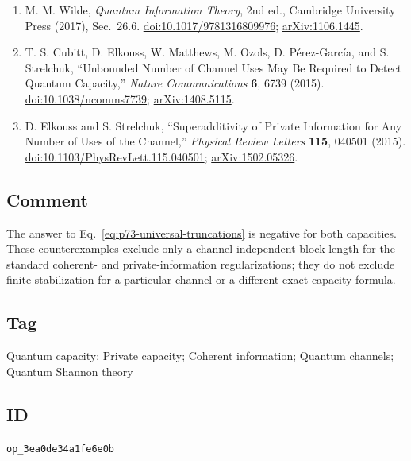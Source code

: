 \begin{enumerate}[label={},leftmargin=4.8em,labelsep=0.5em]
  \footnotesize
  \item[\textup{[Wil17]}]\label{ref:p73-wilde}
  M. M. Wilde, \emph{Quantum Information Theory}, 2nd ed., Cambridge
  University Press (2017), Sec.~26.6.
  \href{https://doi.org/10.1017/9781316809976}%
       {doi:10.1017/9781316809976};
  \href{https://arxiv.org/abs/1106.1445}{arXiv:1106.1445}.

  \item[\textup{[CEM+15]}]\label{ref:p73-cubitt-et-al}
  T. S. Cubitt, D. Elkouss, W. Matthews, M. Ozols, D. P\'erez-Garc\'ia, and
  S. Strelchuk, ``Unbounded Number of Channel Uses May Be Required to Detect
  Quantum Capacity,'' \emph{Nature Communications} \textbf{6}, 6739 (2015).
  \href{https://doi.org/10.1038/ncomms7739}{doi:10.1038/ncomms7739};
  \href{https://arxiv.org/abs/1408.5115}{arXiv:1408.5115}.

  \item[\textup{[ES15]}]\label{ref:p73-elkouss-strelchuk}
  D. Elkouss and S. Strelchuk, ``Superadditivity of Private Information for
  Any Number of Uses of the Channel,'' \emph{Physical Review Letters}
  \textbf{115}, 040501 (2015).
  \href{https://doi.org/10.1103/PhysRevLett.115.040501}%
       {doi:10.1103/PhysRevLett.115.040501};
  \href{https://arxiv.org/abs/1502.05326}{arXiv:1502.05326}.
\end{enumerate}

\subsection*{Comment}

The answer to Eq.~\eqref{eq:p73-universal-truncations} is negative for both
capacities.  These counterexamples exclude only a channel-independent block
length for the standard coherent- and private-information regularizations;
they do not exclude finite stabilization for a particular channel or a
different exact capacity formula.

\subsection*{Tag}

Quantum capacity; Private capacity; Coherent information; Quantum channels;
Quantum Shannon theory

\subsection*{ID}

\texttt{op\_3ea0de34a1fe6e0b}
